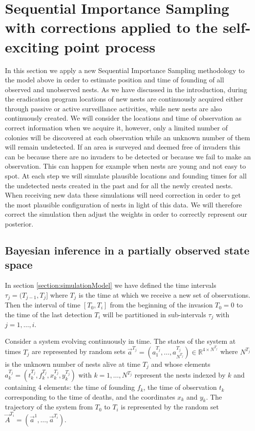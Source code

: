 {\color{red}
\section{Sequential Importance Sampling with corrections applied to the self-exciting point process} \label{sec:SISMethod}

In this section we apply a new Sequential Importance Sampling methodology to the model above in order to estimate position and time of founding of all observed and unobserved nests. As we have discussed in the introduction, during the eradication program locations of new nests are continuously acquired either through passive or active surveillance activities, while new nests are also continuously created. We will consider the locations and time of observation as correct information when we acquire it, however, only a limited number of colonies will be discovered at each observation while an unknown number of them will remain undetected. If an area is surveyed and deemed free of invaders this can be because there are no invaders to be detected or because we fail to make an observation. This can happen for example when nests are young and not easy to spot. At each step we will simulate plausible locations and founding times for all the undetected nests created in the past and for all the newly created nests. When receiving new data these simulations will need correction in order to get the most plausible configuration of nests in light of this data. We will therefore correct the simulation then adjust the weights in order to correctly represent our posterior.

\subsection{Bayesian inference in a partially observed state space} \label{subsec:POS}

In section \ref{section:simulationModel} we have defined the time intervals $\tau_j = (T_{j-1}, T_j]$ where $T_j$ is the time at which we receive a new set of observations. Then the interval of time $[T_0, T_i]$ from the beginning of the invasion $T_0=0$ to the time of the last detection $T_i$ will be partitioned in sub-intervals $\tau_j$ with $j = 1, \dots, i$.

Consider a system evolving continuously in time. The states of the system at times $T_j$ are represented by random sets $\vec{a}^{T_j} = (a^{T_j}_1, \dots, a^{T_j}_{N^{T_j}}) \in \mathbb{R}^{4\times N^{T_j}}$ where $N^{T_j}$ is the unknown number of nests alive at time $T_j$ and whose elements $a^{T_j}_k = (t_k^{T_j}, f_k^{T_j}, x_k^{T_j}, y_k^{T_j})$ with $k = 1, \dots , N^{T_j}$ represent the nests indexed by $k$ and containing 4 elements: the time of founding $f_k$, the time of observation $t_k$ corresponding to the time of deaths, and the coordinates $x_k$ and $y_k$.
The trajectory of the system from $T_0$ to $T_i$ is represented by the random set $\vec{A}^{T_i} = (\vec{a}^1, \dots, \vec{a}^{T_i})$. 

}
